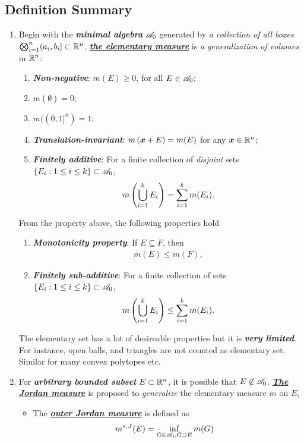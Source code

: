 \documentclass[11pt]{article}
\begin{document}
\subsection{Definition Summary}
\begin{enumerate}
\item Begin with the \emph{\textbf{minimal algebra}} ${\mathscr A}_{0}$ generated by \emph{a collection of all boxes} $\bigotimes_{i=1}^{n}(a_{i},b_{i}] \subset {\mathbb R}^{n}$, \underline{\emph{\textbf{the elementary measure}}} is \emph{a generalization of volumes} in ${\mathbb R}^{n}$: 
\begin{enumerate}
\item \emph{\textbf{Non-negative}}: $m(E) \ge 0$, for all $E\in {\mathscr A}_{0}$;
\item $m(\emptyset) = 0$;
\item $m((0,1]^{n})= 1$;
\item \emph{\textbf{Translation-invariant}}: $m\left(\boldsymbol{x}+ E\right) = m(E)$ for any $\boldsymbol{x}\in {\mathbb R}^{n}$; 
\item \emph{\textbf{Finitely additive}}: For a finite collection of \emph{disjoint} sets $\left\{E_{i}: 1\le i\le k\right\} \subset {\mathscr A}_{0}$, 
$$ m\left(\bigcup_{i=1}^{k}E_{i}\right)= \sum_{i=1}^{k}m(E_{i}).$$
\end{enumerate}
From the property above, the following properties hold
\begin{enumerate}
\item \textit{\textbf{Monotonicity property}}: If $E \subseteq F$, then 
\begin{align*}
m(E) \le m(F),
\end{align*}

\item \emph{\textbf{Finitely sub-additive}}: For a finite collection of sets $\left\{E_{i}: 1\le i\le k\right\} \subset {\mathscr A}_{0}$, 
$$ m\left(\bigcup_{i=1}^{k}E_{i}\right) \le  \sum_{i=1}^{k}m(E_{i}).$$
\end{enumerate}

\begin{remark}
The elementary set has a lot of desireable properties but it is \emph{\textbf{very limited}}. For instance, open balls, and triangles are not counted as elementary set. Similar for many convex polytopes etc.
\end{remark}

\item For \emph{\textbf{arbitrary bounded subset}} $E\subset {\mathbb R}^{n}$, it is possible that $E\not\in {\mathscr A}_{0}$. \underline{\emph{\textbf{The Jordan measure}}} is proposed to \emph{generalize} the elementary measure $m$ on $E$, 
 \begin{itemize}
\item The \underline{\emph{\textbf{outer Jordan measure}}} is defined as 
\begin{align*}
m^{*, J}(E) &= \inf\limits_{G\in {\mathscr A}_{0}, G\supset E}m(G)
\end{align*}


\end{itemize}
\end{enumerate}
\end{document}
